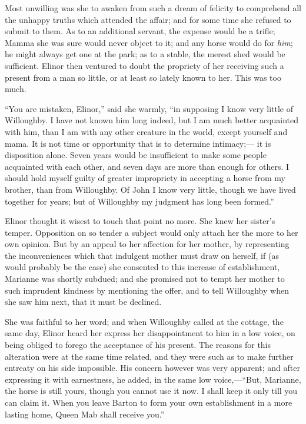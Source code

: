 Most unwilling was she to awaken from such a dream of
felicity to comprehend all the unhappy truths which attended
the affair; and for some time she refused to submit to them.
As to an additional servant, the expense would be a trifle;
Mamma she was sure would never object to it; and any horse
would do for \emph{him}; he might always get one at the park;
as to a stable, the merest shed would be sufficient.
Elinor then ventured to doubt the propriety of her receiving
such a present from a man so little, or at least so lately
known to her.  This was too much.

``You are mistaken, Elinor,'' said she warmly,
``in supposing I know very little of Willoughby.
I have not known him long indeed, but I am much better
acquainted with him, than I am with any other creature
in the world, except yourself and mama.  It is not
time or opportunity that is to determine intimacy;---%
it is disposition alone.  Seven years would be insufficient
to make some people acquainted with each other, and seven
days are more than enough for others.  I should hold
myself guilty of greater impropriety in accepting a horse
from my brother, than from Willoughby.  Of John I know
very little, though we have lived together for years;
but of Willoughby my judgment has long been formed.''

Elinor thought it wisest to touch that point no more.
She knew her sister's temper.  Opposition on so tender a
subject would only attach her the more to her own opinion.
But by an appeal to her affection for her mother,
by representing the inconveniences which that indulgent
mother must draw on herself, if (as would probably be
the case) she consented to this increase of establishment,
Marianne was shortly subdued; and she promised not to
tempt her mother to such imprudent kindness by mentioning
the offer, and to tell Willoughby when she saw him next,
that it must be declined.

She was faithful to her word; and when Willoughby
called at the cottage, the same day, Elinor heard her
express her disappointment to him in a low voice, on
being obliged to forego the acceptance of his present.
The reasons for this alteration were at the same time related,
and they were such as to make further entreaty on his
side impossible.  His concern however was very apparent;
and after expressing it with earnestness, he added,
in the same low voice,---``But, Marianne, the horse is
still yours, though you cannot use it now.  I shall keep
it only till you can claim it.  When you leave Barton
to form your own establishment in a more lasting home,
Queen Mab shall receive you.''

